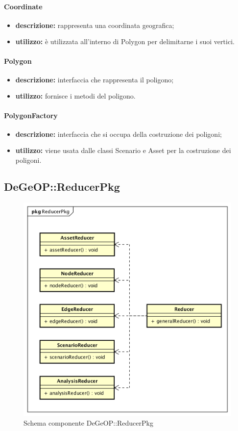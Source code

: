 \paragraph{Coordinate}
\begin{itemize}
	\item \textbf{descrizione:} rappresenta una coordinata geografica;
	\item \textbf{utilizzo:} è utilizzata all'interno di Polygon per delimitarne i suoi vertici.
\end{itemize}
\paragraph{Polygon}
\begin{itemize}
	\item \textbf{descrizione:} interfaccia che rappresenta il poligono;
	\item \textbf{utilizzo:} fornisce i metodi del poligono.
\end{itemize}
\paragraph{PolygonFactory}
\begin{itemize}
	\item \textbf{descrizione:} interfaccia che si occupa della costruzione dei poligoni;
	\item \textbf{utilizzo:} viene usata dalle classi Scenario e Asset per la costruzione dei poligoni.
\end{itemize}
\newpage
\subsection{DeGeOP::ReducerPkg}
\label{pkg::ReducerPkg}
\begin{figure}[H]
	\centering
	\includegraphics[width=\textwidth]{img/PkgDiagram/STReducerPkg.png}
	\caption{Schema componente DeGeOP::ReducerPkg}
\end{figure}

